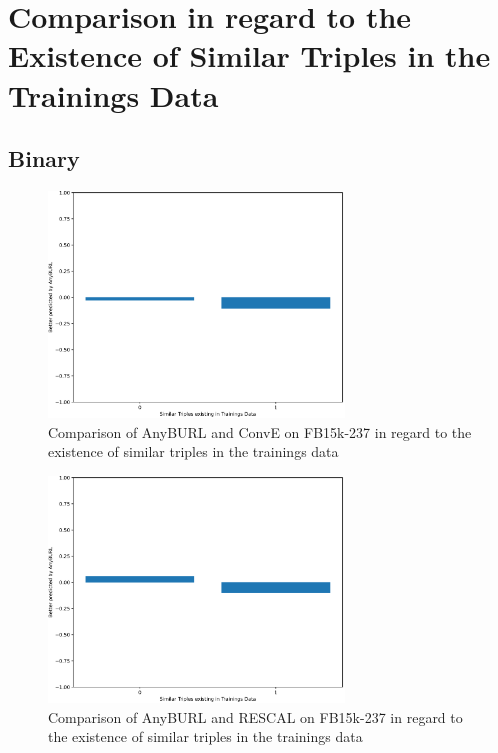 \section{Comparison in regard to the Existence of Similar Triples in the Trainings Data}
\label{appendix:similar_triples}

\subsection{Binary}

\begin{figure}[H]
\centering
\includegraphics[width=0.7\textwidth]{images/similar_triples_binary_anyburl_conve_codex.PNG}
\caption{Comparison of AnyBURL and ConvE on FB15k-237 in regard to the existence of similar triples in the trainings data}
\label{fig:similar_triples_binary_anyburl_conve_fb15k}
\end{figure}

\begin{figure}[H]
\centering
\includegraphics[width=0.7\textwidth]{images/similar_triples_binary_anyburl_rescal_codex.PNG}
\caption{Comparison of AnyBURL and RESCAL on FB15k-237 in regard to the existence of similar triples in the trainings data}
\label{fig:similar_triples_binary_anyburl_rescal_fb15k}
\end{figure}

